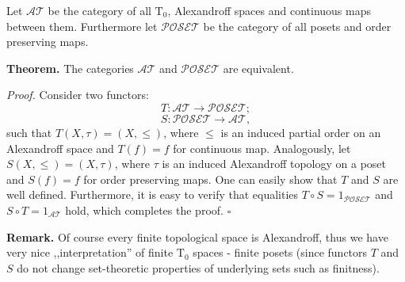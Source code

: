 \documentclass[12pt]{article}
\begin{document}
Let $\mathcal{AT}$ be the category of all $\mathrm{T}_{0}$, Alexandroff spaces and continuous maps between them. Furthermore let $\mathcal{POSET}$ be the category of all posets and order preserving maps.

\textbf{Theorem.} The categories $\mathcal{AT}$ and $\mathcal{POSET}$ are equivalent.

\textit{Proof.} Consider two functors:
$$T:\mathcal{AT}\to\mathcal{POSET};$$
$$S:\mathcal{POSET}\to \mathcal{AT},$$
such that $T(X,\tau)=(X,\leq)$, where $\leq$ is an induced partial order on an Alexandroff space and $T(f)=f$ for continuous map. Analogously, let $S(X,\leq)=(X,\tau)$, where $\tau$ is an induced Alexandroff topology on a poset and $S(f)=f$ for order preserving maps. One can easily show that $T$ and $S$ are well defined. Furthermore, it is easy to verify that equalities $T\circ S=1_{\mathcal{POSET}}$ and $S\circ T=1_{\mathcal{AT}}$ hold, which completes the proof. $\square$

\textbf{Remark.} Of course every finite topological space is Alexandroff, thus we have very nice ,,interpretation'' of finite $\mathrm{T}_{0}$ spaces - finite posets (since functors $T$ and $S$ do not change set-theoretic properties of underlying sets such as finitness).
\end{document}
